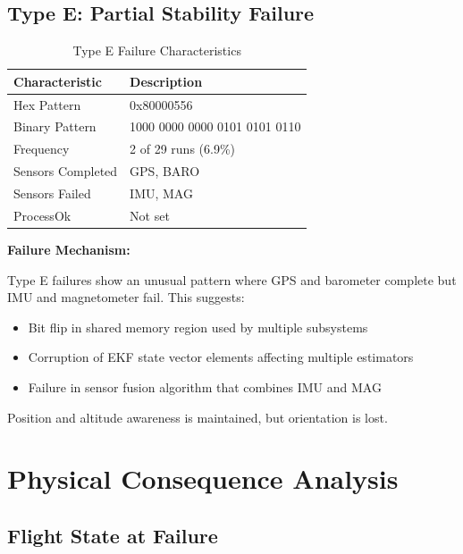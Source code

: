 \documentclass[11pt,a4paper]{article}
\begin{document}
\subsection{Type E: Partial Stability Failure}

\begin{table}[H]
\centering
\caption{Type E Failure Characteristics}
\label{tab:type_e}
\begin{tabular}{@{}lp{10cm}@{}}
\toprule
\textbf{Characteristic} & \textbf{Description} \\
\midrule
Hex Pattern & 0x80000556 \\
Binary Pattern & 1000 0000 0000 0101 0101 0110 \\
Frequency & 2 of 29 runs (6.9\%) \\
Sensors Completed & GPS, BARO \\
Sensors Failed & IMU, MAG \\
ProcessOk & Not set \\
\bottomrule
\end{tabular}
\end{table}

\textbf{Failure Mechanism:}

Type E failures show an unusual pattern where GPS and barometer complete but IMU and magnetometer fail. This suggests:

\begin{itemize}
  \item Bit flip in shared memory region used by multiple subsystems
  \item Corruption of EKF state vector elements affecting multiple estimators
  \item Failure in sensor fusion algorithm that combines IMU and MAG
\end{itemize}

Position and altitude awareness is maintained, but orientation is lost.

\section{Physical Consequence Analysis}

\subsection{Flight State at Failure}
\end{document}
